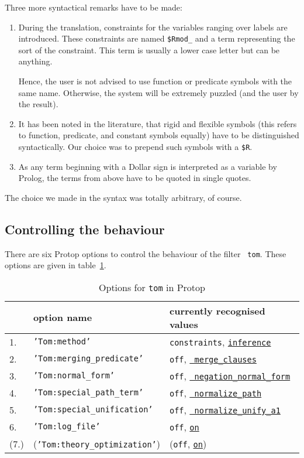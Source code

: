 Three more syntactical remarks have to be made:
\begin{enumerate}
\item During the translation, constraints for the variables ranging over
      labels are introduced. These constraints are named {\tt \$Rmod\_} and
      a term representing the sort of the constraint. This term is usually
      a lower case letter but can be anything.

      Hence, the user is not advised to use function or predicate symbols
      with the same name. Otherwise, the system will be extremely puzzled
      (and the user by the result).
\item It has been noted in the literature, that rigid and flexible symbols
      (this refers to function, predicate, and constant symbols equally)
      have to be distinguished syntactically. Our choice was to prepend such
      symbols with a {\tt \$R}.
\item As any term beginning with a Dollar sign is interpreted as a variable
      by Prolog, the terms from above have to be quoted in single quotes.
\end{enumerate}

The choice we made in the syntax was totally arbitrary, of course.

\subsection*{Controlling the behaviour}

There are six {\sf Protop} options to control the behaviour of the filter {\tt
tom}. These options are given in table~\ref{table:protop.tom.options}.

\makevertother
\begin{table}[htp]
\begin{center}
\begin{tabular}{l|l|l}
 & option name & currently recognised values \\ \hline
1. & {\tt 'Tom:method'} & {\tt constraints}, \underline{{\tt inference}} \\
2. & {\tt 'Tom:merging\_predicate'} & {\tt off}, \underline{{\tt
merge\_clauses}} \\
3. & {\tt 'Tom:normal\_form'} & {\tt off}, \underline{{\tt
negation\_normal\_form}} \\
4. & {\tt 'Tom:special\_path\_term'} & {\tt off}, \underline{{\tt
normalize\_path}} \\
5. & {\tt 'Tom:special\_unification'} & {\tt off}, \underline{{\tt
normalize\_unify\_a1}} \\
6. & {\tt 'Tom:log\_file'} & {\tt off}, \underline{{\tt on}} \\
(7.) & ({\tt 'Tom:theory\_optimization'}) & ({\tt off}, \underline{{\tt on}})
\end{tabular}
\end{center}
\caption{\label{table:protop.tom.options} Options for {\tt tom} in {\sf Protop}}
\end{table}
\makevertactive

